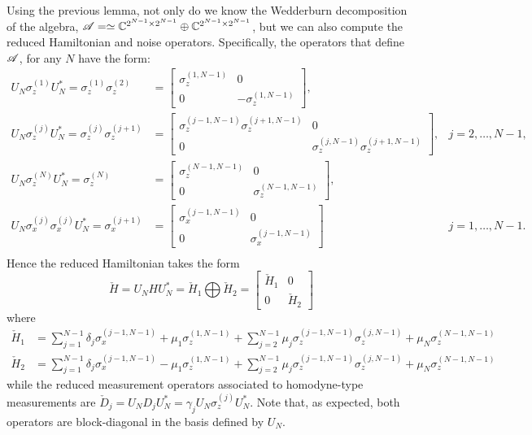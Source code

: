 \documentclass[aihp,12pt]{imsart}
\begin{document}
Using the previous lemma, not only do we know the Wedderburn decomposition of the algebra, $\mathscr{A} = \simeq \mathbb{C}^{2^{N-1} \times 2^{N-1}} \oplus \mathbb{C}^{2^{N-1} \times 2^{N-1}}$, but we can also compute the reduced Hamiltonian and noise operators. 
Specifically, the operators that define $\mathscr{A}$, for any $N$ have the form:
\begin{align*}
    U_N \sigma_z^{(1)} U_N^* = \sigma_z^{(1)}\sigma_z^{(2)} &= \left[\begin{array}{c|c}
         \sigma_z^{(1,N-1)}&0  \\\hline
         0&-\sigma_z^{(1,N-1)} 
    \end{array}\right],\\
    U_N \sigma_z^{(j)} U_N^* = \sigma_z^{(j)}\sigma_z^{(j+1)} &= \left[\begin{array}{c|c}
         \sigma_z^{(j-1,N-1)}\sigma_z^{(j+1,N-1)}&0  \\\hline
         0&\sigma_z^{(j,N-1)}\sigma_z^{(j+1,N-1)} 
    \end{array}\right], & j=2,\dots,N-1,\\
    U_N \sigma_z^{(N)} U_N^* = \sigma_z^{(N)} &= \left[\begin{array}{c|c}
         \sigma_z^{(N-1,N-1)}&0  \\\hline
         0&\sigma_z^{(N-1,N-1)} 
    \end{array}\right],\\
    U_N \sigma_x^{(j)}\sigma_x^{(j)} U_N^* = \sigma_x^{(j+1)} &= \left[\begin{array}{c|c}
         \sigma_x^{(j-1,N-1)}&0  \\\hline
         0&\sigma_x^{(j-1,N-1)} 
    \end{array}\right] & j=1,\dots,N-1.\\
\end{align*}
Hence the reduced Hamiltonian takes the form
\[\check{H} = U_N H U_N^* = \check{H}_1\bigoplus \check{H}_2 = \left[\begin{array}{c|c}
         \check{H}_1&0  \\\hline
         0&\check{H}_2
    \end{array}\right] \]
where 
\begin{align*}
    \check{H}_1 &= \sum_{j=1}^{N-1}\delta_j\sigma_x^{(j-1,N-1)} + \mu_1 \sigma_z^{(1,N-1)} + \sum_{j=2}^{N-1} \mu_j \sigma_z^{(j-1,N-1)}\sigma_z^{(j,N-1)} + \mu_N \sigma_z^{(N-1,N-1)}\\
    \check{H}_2 &= \sum_{j=1}^{N-1}\delta_j\sigma_x^{(j-1,N-1)} -\mu_1 \sigma_z^{(1,N-1)} + \sum_{j=2}^{N-1} \mu_j \sigma_z^{(j-1,N-1)}\sigma_z^{(j,N-1)} + \mu_N \sigma_z^{(N-1,N-1)}
\end{align*}
while the reduced measurement operators associated to homodyne-type measurements are $\check{D}_j = U_N D_j U_N^* = \gamma_j U_N \sigma_z^{(j)} U_N^*$. Note that, as expected, both operators are block-diagonal in the basis defined by $U_N$.
\end{document}
